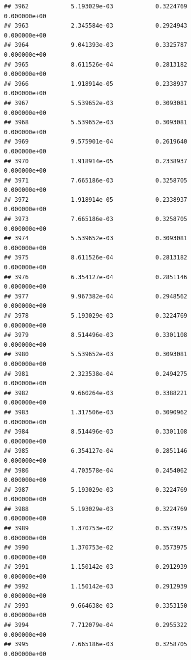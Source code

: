 \documentclass[
]{article}
\begin{document}
\begin{verbatim}
## 3962            5.193029e-03            0.3224769            0.000000e+00
## 3963            2.345584e-03            0.2924943            0.000000e+00
## 3964            9.041393e-03            0.3325787            0.000000e+00
## 3965            8.611526e-04            0.2813182            0.000000e+00
## 3966            1.918914e-05            0.2338937            0.000000e+00
## 3967            5.539652e-03            0.3093081            0.000000e+00
## 3968            5.539652e-03            0.3093081            0.000000e+00
## 3969            9.575901e-04            0.2619640            0.000000e+00
## 3970            1.918914e-05            0.2338937            0.000000e+00
## 3971            7.665186e-03            0.3258705            0.000000e+00
## 3972            1.918914e-05            0.2338937            0.000000e+00
## 3973            7.665186e-03            0.3258705            0.000000e+00
## 3974            5.539652e-03            0.3093081            0.000000e+00
## 3975            8.611526e-04            0.2813182            0.000000e+00
## 3976            6.354127e-04            0.2851146            0.000000e+00
## 3977            9.967382e-04            0.2948562            0.000000e+00
## 3978            5.193029e-03            0.3224769            0.000000e+00
## 3979            8.514496e-03            0.3301108            0.000000e+00
## 3980            5.539652e-03            0.3093081            0.000000e+00
## 3981            2.323538e-04            0.2494275            0.000000e+00
## 3982            9.660264e-03            0.3388221            0.000000e+00
## 3983            1.317506e-03            0.3090962            0.000000e+00
## 3984            8.514496e-03            0.3301108            0.000000e+00
## 3985            6.354127e-04            0.2851146            0.000000e+00
## 3986            4.703578e-04            0.2454062            0.000000e+00
## 3987            5.193029e-03            0.3224769            0.000000e+00
## 3988            5.193029e-03            0.3224769            0.000000e+00
## 3989            1.370753e-02            0.3573975            0.000000e+00
## 3990            1.370753e-02            0.3573975            0.000000e+00
## 3991            1.150142e-03            0.2912939            0.000000e+00
## 3992            1.150142e-03            0.2912939            0.000000e+00
## 3993            9.664638e-03            0.3353150            0.000000e+00
## 3994            7.712079e-04            0.2955322            0.000000e+00
## 3995            7.665186e-03            0.3258705            0.000000e+00

\end{verbatim}
\end{document}
